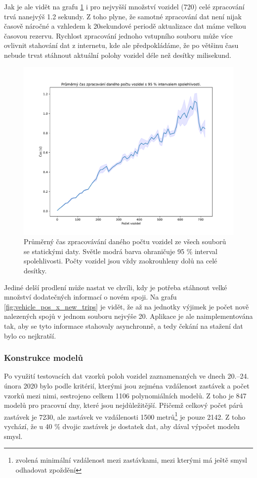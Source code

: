\bigbreak


Jak je ale vidět na grafu \ref{fig:file_process_time} i pro nejvyšší množství vozidel (720) celé zpracování trvá nanejvýš 1.2 sekundy. Z toho plyne, že samotné zpracování dat není nijak časově náročné a vzhledem k 20sekundové periodě aktualizace dat máme velkou časovou rezervu. Rychlost zpracování jednoho vstupního souboru může více ovlivnit stahování dat z internetu, kde ale předpokládáme, že po většinu času nebude trvat stáhnout aktuální polohy vozidel déle než desítky milisekund.


\bigbreak


\begin{figure}
   \centering
 \includegraphics[width=0.7\linewidth]{../img/file_process_time}
 \caption{Průměrný čas zpracovávání daného počtu vozidel ze všech souborů se statickými daty. Světle modrá barva ohraničuje 95 \% interval spolehlivosti. Počty vozidel jsou vždy zaokrouhleny dolů na celé desítky.}
 \label{fig:file_process_time}
\end{figure}


\bigbreak


Jediné delší prodlení může nastat ve chvíli, kdy je potřeba stáhnout velké množství dodatečných informací o novém spoji. Na grafu \ref{fig:vehicle_pos_x_new_trips} je vidět, že až na jednotky výjimek je počet nově nalezených spojů v jednom souboru nejvýše 20. Aplikace je ale naimplementována tak, aby se tyto informace stahovaly asynchronně, a tedy čekání na stažení dat bylo co nejkratší.


\subsubsection{Konstrukce modelů}


Po využití testovacích dat vzorků poloh vozidel zaznamenaných ve dnech 20.--24. února 2020 bylo podle kritérií, kterými jsou zejména vzdálenost zastávek a počet vzorků mezi nimi, sestrojeno celkem 1106 polynomiálních modelů. Z toho je 847 modelů pro pracovní dny, které jsou nejdůležitější. Přičemž celkový počet párů zastávek je 7230, ale zastávek ve vzdálenosti 1500 metrů\footnote{zvolená minimální vzdálenost mezi zastávkami, mezi kterými má ještě smysl odhadovat zpoždění} je pouze 2142. Z toho vychází, že u 40 \% dvojic zastávek je dostatek dat, aby dával výpočet modelu smysl.


